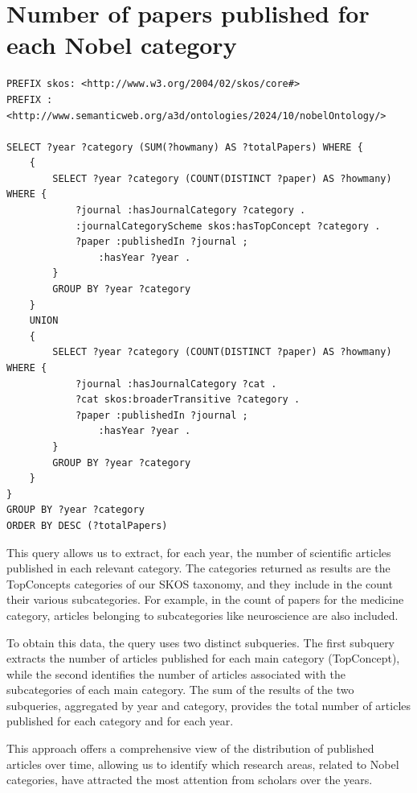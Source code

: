 \documentclass{article}
\begin{document}
\newpage

\section{Number of papers published for each Nobel category}
\begin{lstlisting}
PREFIX skos: <http://www.w3.org/2004/02/skos/core#>
PREFIX : <http://www.semanticweb.org/a3d/ontologies/2024/10/nobelOntology/>

SELECT ?year ?category (SUM(?howmany) AS ?totalPapers) WHERE {
    {
        SELECT ?year ?category (COUNT(DISTINCT ?paper) AS ?howmany) WHERE {
            ?journal :hasJournalCategory ?category .
            :journalCategoryScheme skos:hasTopConcept ?category .
            ?paper :publishedIn ?journal ;
                :hasYear ?year .
        }
        GROUP BY ?year ?category
    }
    UNION
    {
        SELECT ?year ?category (COUNT(DISTINCT ?paper) AS ?howmany) WHERE {
            ?journal :hasJournalCategory ?cat .
            ?cat skos:broaderTransitive ?category .
            ?paper :publishedIn ?journal ;
                :hasYear ?year .
        }
        GROUP BY ?year ?category
    }
}
GROUP BY ?year ?category
ORDER BY DESC (?totalPapers)
\end{lstlisting}

\noindent This query allows us to extract, for each year, the number of scientific articles published in each relevant category. The categories returned
as results are the TopConcepts categories of our SKOS taxonomy, and they include in the count their various subcategories. For example, in the count
of papers for the medicine category, articles belonging to subcategories like neuroscience are also included.

To obtain this data, the query uses two distinct subqueries. The first subquery extracts the number of articles published for each main category
(TopConcept), while the second identifies the number of articles associated with the subcategories of each main category. The sum of the results of
the two subqueries, aggregated by year and category, provides the total number of articles published for each category and for each year.

\newpage

\noindent This approach offers a comprehensive view of the distribution of published articles over time, allowing us to identify which research areas, related
to Nobel categories, have attracted the most attention from scholars over the years.
\end{document}
